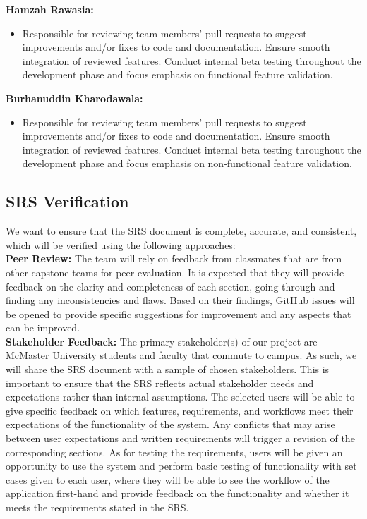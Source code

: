 \documentclass[12pt, titlepage]{article}
\begin{document}
\textbf{Hamzah Rawasia:}
\begin{itemize}
    \item Responsible for reviewing team members’ pull requests to suggest improvements and/or fixes to code and documentation. Ensure smooth integration of reviewed features. Conduct internal beta testing throughout the development phase and focus emphasis on functional feature validation.
\end{itemize}

\textbf{Burhanuddin Kharodawala:}
\begin{itemize}
    \item Responsible for reviewing team members’ pull requests to suggest improvements and/or fixes to code and documentation. Ensure smooth integration of reviewed features. Conduct internal beta testing throughout the development phase and focus emphasis on non-functional feature validation.
\end{itemize}

\subsection{SRS Verification}

We want to ensure that the SRS document is complete, accurate, and consistent, which will be verified using the following approaches: \\

\noindent \textbf{Peer Review:} The team will rely on feedback from classmates that are from other capstone teams for peer evaluation. It is expected that they will provide feedback on the clarity and completeness of each section, going through and finding any inconsistencies and flaws. Based on their findings, GitHub issues will be opened to provide specific suggestions for improvement and any aspects that can be improved. \\ 

\noindent \textbf{Stakeholder Feedback:} The primary stakeholder(s) of our project are McMaster University students and faculty that commute to campus. As such, we will share the SRS document with a sample of chosen stakeholders. This is important to ensure that the SRS reflects actual stakeholder needs and expectations rather than internal assumptions. The selected users will be able to give specific feedback on which features, requirements, and workflows meet their expectations of the functionality of the system. Any conflicts that may arise between user expectations and written requirements will trigger a revision of the corresponding sections. As for testing the requirements, users will be given an opportunity to use the system and  perform basic testing of functionality with set cases given to each user, where they will be able to see the workflow of the application first-hand and provide feedback on the functionality and whether it meets the requirements stated in the SRS. \\
\end{document}
